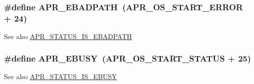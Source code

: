 \subsubsection[{\texorpdfstring{A\+P\+R\+\_\+\+E\+B\+A\+D\+P\+A\+TH}{APR_EBADPATH}}]{\setlength{\rightskip}{0pt plus 5cm}\#define A\+P\+R\+\_\+\+E\+B\+A\+D\+P\+A\+TH~({\bf A\+P\+R\+\_\+\+O\+S\+\_\+\+S\+T\+A\+R\+T\+\_\+\+E\+R\+R\+OR} + 24)}\hypertarget{group__APR__Error_ga1731292eb3e3cdc801d3bf0b09cd8da7}{}\label{group__APR__Error_ga1731292eb3e3cdc801d3bf0b09cd8da7}
\begin{DoxySeeAlso}{See also}
\hyperlink{group__APR__STATUS__IS_ga0758d7227209e4311c843c752c0dd075}{A\+P\+R\+\_\+\+S\+T\+A\+T\+U\+S\+\_\+\+I\+S\+\_\+\+E\+B\+A\+D\+P\+A\+TH} 
\end{DoxySeeAlso}
\subsubsection[{\texorpdfstring{A\+P\+R\+\_\+\+E\+B\+U\+SY}{APR_EBUSY}}]{\setlength{\rightskip}{0pt plus 5cm}\#define A\+P\+R\+\_\+\+E\+B\+U\+SY~({\bf A\+P\+R\+\_\+\+O\+S\+\_\+\+S\+T\+A\+R\+T\+\_\+\+S\+T\+A\+T\+US} + 25)}\hypertarget{group__APR__Error_gab6e5bc99dbace4a91d8d0adcbd8fd66b}{}\label{group__APR__Error_gab6e5bc99dbace4a91d8d0adcbd8fd66b}
\begin{DoxySeeAlso}{See also}
\hyperlink{group__APR__STATUS__IS_gabb92ad7b6ef304132de70e9e5cbaa896}{A\+P\+R\+\_\+\+S\+T\+A\+T\+U\+S\+\_\+\+I\+S\+\_\+\+E\+B\+U\+SY} 
\end{DoxySeeAlso}
